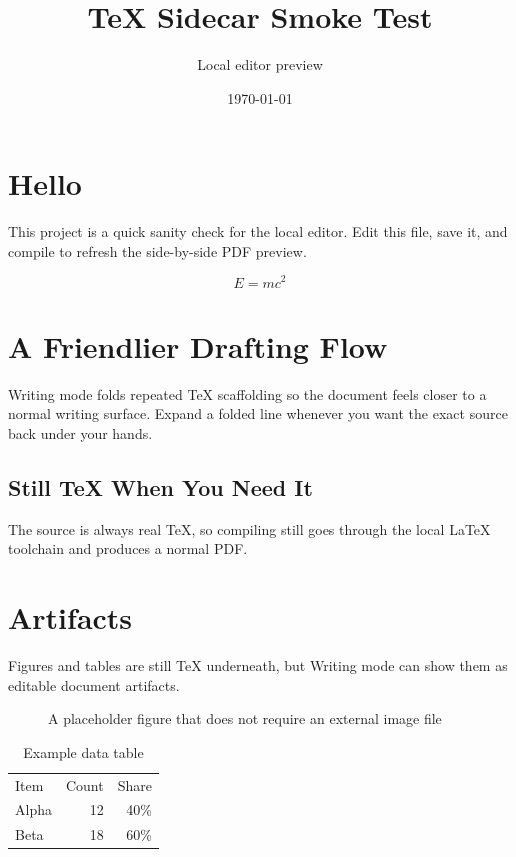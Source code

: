 \documentclass{article}
\title{TeX Sidecar Smoke Test}
\author{Local editor preview}
\date{\today}
\begin{document}
\maketitle

\section{Hello}

This project is a quick sanity check for the local editor. Edit this file, save it, and compile to refresh the side-by-side PDF preview.

\[
E = mc^2
\]

\section{A Friendlier Drafting Flow}

Writing mode folds repeated TeX scaffolding so the document feels closer to a normal writing surface. Expand a folded line whenever you want the exact source back under your hands.

\subsection{Still TeX When You Need It}

The source is always real TeX, so compiling still goes through the local LaTeX toolchain and produces a normal PDF.

\section{Artifacts}

Figures and tables are still TeX underneath, but Writing mode can show them as editable document artifacts.

\begin{figure}
\centering
\fbox{\rule{0pt}{1.2in}\rule{2.4in}{0pt}}
\caption{A placeholder figure that does not require an external image file}
\end{figure}

\begin{table}
\centering
\begin{tabular}{lrr}
Item & Count & Share \\
Alpha & 12 & 40\% \\
Beta & 18 & 60\% \\
\end{tabular}
\caption{Example data table}
\end{table}
\end{document}
